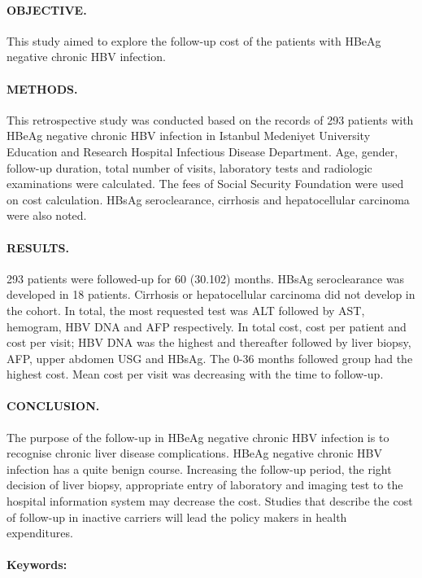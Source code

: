 
\paragraph*{OBJECTIVE. } This study aimed to explore the follow-up cost of the patients with HBeAg negative chronic HBV infection.

\paragraph*{METHODS.} This retrospective study was conducted based on the records of 293 patients with HBeAg negative chronic HBV infection in Istanbul Medeniyet University Education and Research Hospital Infectious Disease Department. Age, gender, follow-up duration, total number of visits, laboratory tests and radiologic examinations were calculated. The fees of Social Security Foundation were used on cost calculation. HBsAg seroclearance, cirrhosis and hepatocellular carcinoma were also noted.

\paragraph*{RESULTS.} 293 patients were followed-up for 60 (30.102) months. HBsAg seroclearance was developed in 18 patients. Cirrhosis or hepatocellular carcinoma did not develop in the cohort. In total, the most requested test was ALT followed by AST, hemogram, HBV DNA and AFP respectively. In total cost, cost per patient and cost per visit; HBV DNA was the highest and thereafter followed by liver biopsy, AFP, upper abdomen USG and HBsAg. The 0-36 months followed group had the highest cost. Mean cost per visit was decreasing with the time to follow-up. 

\paragraph*{CONCLUSION.} The purpose of the follow-up in HBeAg negative chronic HBV infection is to recognise chronic liver disease complications. HBeAg negative chronic HBV infection has a quite benign course. Increasing the follow-up period, the right decision of liver biopsy, appropriate entry of laboratory and imaging test to the hospital information system may decrease the cost. Studies that describe the cost of follow-up in inactive carriers will lead the policy makers in health expenditures.



 




\paragraph*{Keywords:} \keywordnamesi
\cleardoublepage
{}